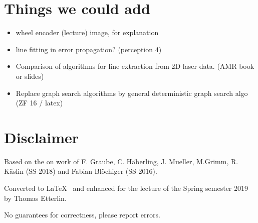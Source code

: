 \documentclass[fontsize=6pt]{scrartcl}
\begin{document}
\begin{multicols*}{4}
\section*{Things we could add}
\begin{itemize}
	\item wheel encoder (lecture) image, for explanation
	\item line fitting in error propagation? (perception 4)
	\item Comparison of algorithms for line extraction from 2D laser data. (AMR book or slides)
	\item Replace graph search algorithms by general deterministic graph search algo (ZF 16 / latex)
\end{itemize}

\section*{Disclaimer}
Based on the on work of F. Graube, C. Häberling, J. Mueller, M.Grimm, R. Käslin (SS 2018) and Fabian Blöchiger (SS 2016).

Converted to \LaTeX~ and enhanced for the lecture of the Spring semester 2019 by Thomas Etterlin.

No guarantees for correctness, please report errors.

\end{multicols*}
\end{document}
